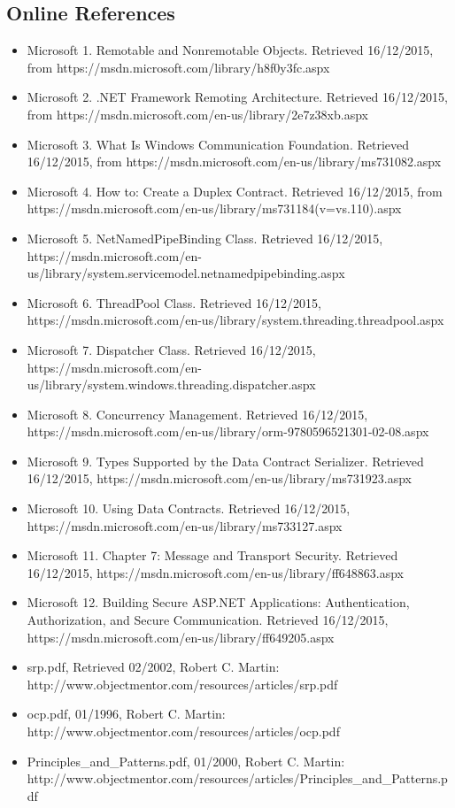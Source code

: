 \subsection {Online References}
\begin{itemize}
	\item Microsoft 1. Remotable and Nonremotable Objects. Retrieved 16/12/2015, from https://msdn.microsoft.com/library/h8f0y3fc.aspx
	\item Microsoft 2. .NET Framework Remoting Architecture. Retrieved 16/12/2015, from https://msdn.microsoft.com/en-us/library/2e7z38xb.aspx
	\item Microsoft 3. What Is Windows Communication Foundation. Retrieved 16/12/2015, from https://msdn.microsoft.com/en-us/library/ms731082.aspx
	\item Microsoft 4. How to: Create a Duplex Contract. Retrieved 16/12/2015, from https://msdn.microsoft.com/en-us/library/ms731184(v=vs.110).aspx
	\item Microsoft 5. NetNamedPipeBinding Class. Retrieved 16/12/2015, https://msdn.microsoft.com/en-us/library/system.servicemodel.netnamedpipebinding.aspx
	\item Microsoft 6. ThreadPool Class. Retrieved 16/12/2015, https://msdn.microsoft.com/en-us/library/system.threading.threadpool.aspx
	\item Microsoft 7. Dispatcher Class. Retrieved 16/12/2015, https://msdn.microsoft.com/en-us/library/system.windows.threading.dispatcher.aspx
	\item Microsoft 8. Concurrency Management. Retrieved 16/12/2015, https://msdn.microsoft.com/en-us/library/orm-9780596521301-02-08.aspx
	\item Microsoft 9. Types Supported by the Data Contract Serializer. Retrieved 16/12/2015, https://msdn.microsoft.com/en-us/library/ms731923.aspx
	\item Microsoft 10. Using Data Contracts. Retrieved 16/12/2015, https://msdn.microsoft.com/en-us/library/ms733127.aspx
	\item Microsoft 11. Chapter 7: Message and Transport Security. Retrieved 16/12/2015, https://msdn.microsoft.com/en-us/library/ff648863.aspx
	\item Microsoft 12. Building Secure ASP.NET Applications: Authentication, Authorization, and Secure Communication. Retrieved 16/12/2015, https://msdn.microsoft.com/en-us/library/ff649205.aspx
  \item srp.pdf, Retrieved 02/2002, Robert C. Martin:   http://www.objectmentor.com/resources/articles/srp.pdf
  \item ocp.pdf, 01/1996, Robert C. Martin:   http://www.objectmentor.com/resources/articles/ocp.pdf
  \item Principles_and_Patterns.pdf, 01/2000, Robert C. Martin: http://www.objectmentor.com/resources/articles/Principles_and_Patterns.pdf
\end{itemize}
